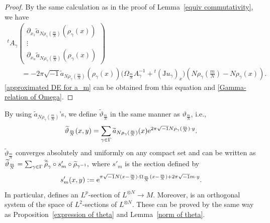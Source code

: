 \documentclass[10pt,a4paper]{amsart}
\numberwithin{equation}{section}
\newcommand{\Z}{\mathbb{Z}}
\renewcommand{\tilde}{\widetilde}
\newcommand{\vardbtilde}[1]{\tilde{\raisebox{0pt}[0.85\height]{$\tilde{#1}$}}}
\def\J{\mathrm{J}}
\begin{document}
\begin{proof}
By the same calculation as in the proof of Lemma~\ref{equiv commutativity}, we have
\begin{gather*}
{}^tA_{\gamma}
\begin{pmatrix}
\partial_{x_1}{\tilde a}_{N\rho_\gamma (\frac{m}{N})}( \rho_\gamma(x))\\
\vdots \\
\partial_{x_n}{\tilde a}_{N\rho_\gamma (\frac{m}{N})}( \rho_\gamma(x))
\end{pmatrix}\\
\qquad=-2\pi\sqrt{-1}{\tilde a}_{N\rho_\gamma (\frac{m}{N})}( \rho_\gamma(x))\bigl(\Omega_{\frac{m}{N}}A^{-1}_{\gamma}+{}^t( \J u_{\gamma})_x\bigr)
\left({N\rho_\gamma \left(\frac{m}{N}\right)}-N\rho_\gamma (x)\right).
\end{gather*}
\eqref{approximated DE for a_m} can be obtained from this equation and \eqref{Gamma-relation of Omega}.
\end{proof}

By using ${\tilde a}_{N\rho_\gamma (\frac{m}{N})}$'s, we define ${\tilde \vartheta}_{\frac{m}{N}}$ in the same manner as $\vartheta_{\frac{m}{N}}$, i.e.,
\[
{\tilde \vartheta}_{\frac{m}{N}}(x,y)=\sum_{\gamma \in \Gamma}{\tilde a}_{N\rho_\gamma (\frac{m}{N})}(x){\rm e}^{2\pi\sqrt{-1}N\rho_\gamma (\frac{m}{N})\cdot y}.
\]
${\tilde \vartheta}_{\frac{m}{N}}$ converges absolutely and uniformly on any compact set and can be written as
$
{\tilde \vartheta}_{\frac{m}{N}}=\sum_{\gamma \in \Gamma}{\vardbtilde \rho}_\gamma \circ s'_m\circ {\tilde \rho}_{\gamma^{-1}},
$
where $s'_m$ is the section defined by
\[
s'_m(x, y):={\rm e}^{\pi\sqrt{-1}N(x-\frac{m}{N})\cdot \Omega_{\frac{m}{N}}(x-\frac{m}{N})+2\pi\sqrt{-1}m\cdot y}.
\]
In particular, \smash{${\tilde \vartheta}_{\frac{m}{N}}$} defines an $L^p$-section of $L^{\otimes N}\to M$. Moreover, \smash{$\big\{{\tilde \vartheta}_{\frac{m}{N}}\big\}_{\frac{m}{N}\in F\cap \frac{1}{N}\Z^n}$} is an orthogonal system of the space of $L^2$-sections of $L^{\otimes N}$.
These can be proved by the same way as Proposition~\ref{expression of theta} and Lemma~\ref{norm of theta}.
\end{document}
